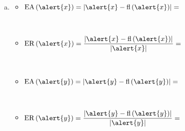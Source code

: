 \begin{frame}
\begin{solution}
\begin{enumerate}[a)]
			\item

			      \begin{multicols}{2}
				      \begin{itemize}

					      \item

					            \begin{math}
						            \operatorname{EA}\left(\alert{x}\right)=
						            \left
						            |\alert{x}-
						            \operatorname{fl}\left(\alert{x}\right)
						            \right|=
					            \end{math}

					            \

					      \item

					            \begin{math}
						            \operatorname{ER}\left(\alert{x}\right)=
						            \dfrac{
							            \left|
							            \alert{x}-
							            \operatorname{fl}\left(\alert{x}\right)
							            \right|}{
							            \left|
							            \alert{x}
							            \right|}=
					            \end{math}

					            \

					      \item

					            \begin{math}
						            \operatorname{EA}\left(\alert{y}\right)=
						            \left|
						            \alert{y}-
						            \operatorname{fl}\left(\alert{y}\right)
						            \right|=
					            \end{math}

					            \

					      \item

					            \begin{math}
						            \operatorname{ER}\left(\alert{y}\right)=
						            \dfrac{
							            \left|
							            \alert{y}-
							            \operatorname{fl}\left(\alert{y}\right)
							            \right|}{
							            \left|
							            \alert{y}
							            \right|}=
					            \end{math}
				      \end{itemize}
			      \end{multicols}
		\end{enumerate}
	\end{solution}
\end{frame}

